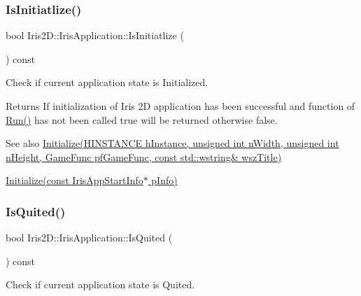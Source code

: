 \subsubsection{\texorpdfstring{Is\+Initiatlize()}{IsInitiatlize()}}
{\footnotesize\ttfamily bool Iris2\+D\+::\+Iris\+Application\+::\+Is\+Initiatlize (\begin{DoxyParamCaption}{ }\end{DoxyParamCaption}) const}



Check if current application state is Initialized. 

\begin{DoxyReturn}{Returns}
If initialization of Iris 2D application has been successful and function of \hyperlink{class_iris2_d_1_1_iris_application_ae6bb59365978c945201fd8cf82105e4f}{Run()} has not been called true will be returned otherwise false. 
\end{DoxyReturn}
\begin{DoxySeeAlso}{See also}
\hyperlink{class_iris2_d_1_1_iris_application_a84f3ddebb3a3ffb0c172bd41fb952e1a}{Initialize(\+H\+I\+N\+S\+T\+A\+N\+C\+E h\+Instance, unsigned int n\+Width, unsigned int n\+Height, Game\+Func pf\+Game\+Func, const std\+::wstring\& wsz\+Title)} 

\hyperlink{class_iris2_d_1_1_iris_application_ac20656815694f980fccfc4369727a9a9}{Initialize(const Iris\+App\+Start\+Info$\ast$ p\+Info)} 
\end{DoxySeeAlso}
\mbox{\label{class_iris2_d_1_1_iris_application_ae9760ff496a4c80f96ad49331407c2e4}} 
\subsubsection{\texorpdfstring{Is\+Quited()}{IsQuited()}}
{\footnotesize\ttfamily bool Iris2\+D\+::\+Iris\+Application\+::\+Is\+Quited (\begin{DoxyParamCaption}{ }\end{DoxyParamCaption}) const}



Check if current application state is Quited. 

